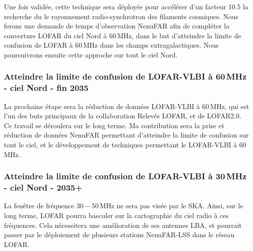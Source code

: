 \pg
Une fois valid\'ee, cette technique sera d\'eploy\'ee pour acc\'el\'erer d'un facteur 10.5 la recherche du le rayonnement radio-synchrotron des filaments cosmiques. Nous ferons une demande de temps d'observation NenuFAR afin de compl\'eter la couverture LOFAR du ciel Nord \`a 60\,MHz, dans le but d'atteindre la limite de confusion de LOFAR \`a 60\,MHz dans les champs extragalactiques. Nous poursuivrons ensuite cette approche sur tout le ciel Nord. %

\subsubsection{Atteindre la limite de confusion de LOFAR-VLBI \`a 60\,MHz - ciel Nord - fin 2035}

\pg
La prochaine \'etape sera la r\'eduction de donn\'ees LOFAR-VLBI \`a 60\,MHz, qui est l'un des buts principaux de la collaboration Relev\'es LOFAR, et de LOFAR2.0. Ce travail se d\'eroulera sur le long terme. Ma contribution sera la prise et r\'eduction de donn\'ees NenuFAR permettant d'atteindre la limite de confusion sur tout le ciel, et le d\'eveloppement de techniques permettant le LOFAR-VLBI \`a 60\,MHz.


\subsubsection{Atteindre la limite de confusion de LOFAR-VLBI \`a 30\,MHz - ciel Nord - 2035+}

\pg
La fen\^etre de fr\'equence $30-50$\,MHz ne sera pas vis\'ee par le SKA. Ainsi, sur le long terme, LOFAR pourra basculer sur la cartographie du ciel radio \`a ces fr\'equences. Cela n\'ecessitera une am\'elioration de ses antennes LBA, et pourrait passer par le d\'eploiement de plusieurs stations NenuFAR-LSS dans le r\'eseau LOFAR. 

%
%
%	
%

